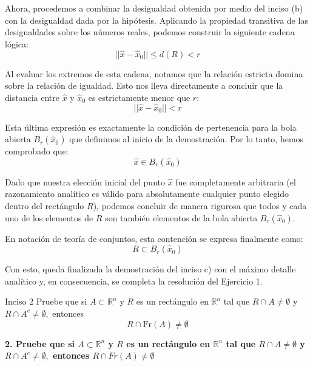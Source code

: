 \documentclass[11pt,letterpaper]{article}
\begin{document}
Ahora, procedemos a combinar la desigualdad obtenida por medio del inciso (b) con la desigualdad dada por la hipótesis. Aplicando la propiedad transitiva de las desigualdades sobre los números reales, podemos construir la siguiente cadena lógica:
\begin{equation*}
||\hat{x} - \hat{x}_{0}|| \le d(R) < r
\end{equation*}

Al evaluar los extremos de esta cadena, notamos que la relación estricta domina sobre la relación de igualdad. Esto nos lleva directamente a concluir que la distancia entre $\hat{x}$ y $\hat{x}_{0}$ es estrictamente menor que $r$:
\begin{equation*}
||\hat{x} - \hat{x}_{0}|| < r
\end{equation*}

Esta última expresión es exactamente la condición de pertenencia para la bola abierta $B_{r}(\hat{x}_{0})$ que definimos al inicio de la demostración. Por lo tanto, hemos comprobado que:
\begin{equation*}
\hat{x} \in B_{r}(\hat{x}_{0})
\end{equation*}

Dado que nuestra elección inicial del punto $\hat{x}$ fue completamente arbitraria (el razonamiento analítico es válido para absolutamente cualquier punto elegido dentro del rectángulo $R$), podemos concluir de manera rigurosa que todos y cada uno de los elementos de $R$ son también elementos de la bola abierta $B_{r}(\hat{x}_{0})$. 

En notación de teoría de conjuntos, esta contención se expresa finalmente como:
\begin{equation*}
R \subset B_{r}(\hat{x}_{0})
\end{equation*}

Con esto, queda finalizada la demostración del inciso c) con el máximo detalle analítico y, en consecuencia, se completa la resolución del Ejercicio 1.

\begin{inciso}{Inciso 2}
Pruebe que si $A\subset\mathbb{R}^{n}$ y $R$ es un rectángulo en $\mathbb{R}^{n}$ tal que $R\cap A\neq\emptyset$ y $R\cap A^{c}\neq\emptyset,$ entonces 
\begin{equation*}
    R\cap \text{Fr}(A)\neq\emptyset
\end{equation*}
\end{inciso}

\textbf{2. Pruebe que si $A\subset\mathbb{R}^{n}$ y $R$ es un rectángulo en $\mathbb{R}^{n}$ tal que $R\cap A\ne\emptyset$ y $R\cap A^{c}\ne\emptyset,$ entonces $R\cap Fr(A)\ne\emptyset$}
\end{document}
